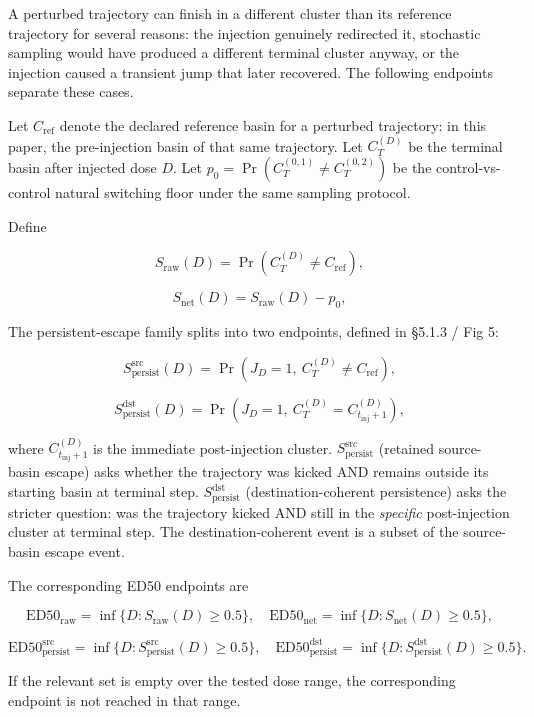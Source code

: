\documentclass{article}
\theoremstyle{plain}
\theoremstyle{definition}
\begin{document}
A perturbed trajectory can finish in a different cluster than its reference trajectory for several reasons: the injection genuinely redirected it, stochastic sampling would have produced a different terminal cluster anyway, or the injection caused a transient jump that later recovered. The following endpoints separate these cases.

Let \(C_{\mathrm{ref}}\) denote the declared reference basin for a perturbed trajectory: in this paper, the pre-injection basin of that same trajectory. Let \(C_T^{(D)}\) be the terminal basin after injected dose \(D\). Let \(p_0=\Pr(C_T^{(0,1)}\neq C_T^{(0,2)})\) be the control-vs-control natural switching floor under the same sampling protocol.

Define

\[S_{\mathrm{raw}}(D)
=
\Pr(C_T^{(D)}\neq C_{\mathrm{ref}}),\]

\[S_{\mathrm{net}}(D)
=
S_{\mathrm{raw}}(D)-p_0,\]

The persistent-escape family splits into two endpoints, defined in §5.1.3 / Fig 5:

\[S_{\mathrm{persist}}^{\mathrm{src}}(D)
=
\Pr(J_D=1,\ C_T^{(D)}\neq C_{\mathrm{ref}}),\]

\[S_{\mathrm{persist}}^{\mathrm{dst}}(D)
=
\Pr(J_D=1,\ C_T^{(D)}=C_{t_{\mathrm{inj}}+1}^{(D)}),\]

where \(C_{t_{\mathrm{inj}}+1}^{(D)}\) is the immediate post-injection cluster. \(S_{\mathrm{persist}}^{\mathrm{src}}\) (retained source-basin escape) asks whether the trajectory was kicked AND remains outside its starting basin at terminal step. \(S_{\mathrm{persist}}^{\mathrm{dst}}\) (destination-coherent persistence) asks the stricter question: was the trajectory kicked AND still in the \textit{specific} post-injection cluster at terminal step. The destination-coherent event is a subset of the source-basin escape event.

The corresponding ED50 endpoints are

\[\mathrm{ED50}_{\mathrm{raw}}
=
\inf\{D:S_{\mathrm{raw}}(D)\ge 0.5\},
\quad
\mathrm{ED50}_{\mathrm{net}}
=
\inf\{D:S_{\mathrm{net}}(D)\ge 0.5\},\]

\[\mathrm{ED50}_{\mathrm{persist}}^{\mathrm{src}}
=
\inf\{D:S_{\mathrm{persist}}^{\mathrm{src}}(D)\ge 0.5\},
\quad
\mathrm{ED50}_{\mathrm{persist}}^{\mathrm{dst}}
=
\inf\{D:S_{\mathrm{persist}}^{\mathrm{dst}}(D)\ge 0.5\}.\]

If the relevant set is empty over the tested dose range, the corresponding endpoint is not reached in that range.
\end{document}
